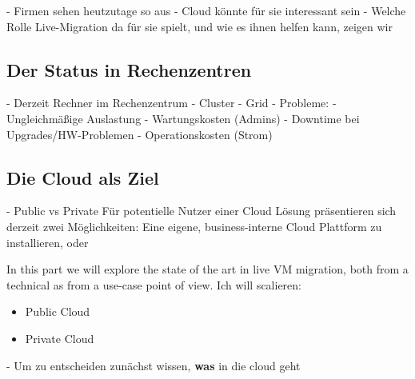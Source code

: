 \documentclass[draft,journal]{IEEEtran}
\begin{document}

- Firmen sehen heutzutage so aus
- Cloud könnte für sie interessant sein
- Welche Rolle Live-Migration da für sie spielt, und wie es ihnen
helfen kann, zeigen wir

\subsection{Der Status in Rechenzentren}
- Derzeit Rechner im Rechenzentrum
- Cluster
- Grid
- Probleme:
  - Ungleichmäßige Auslastung
  - Wartungskosten (Admins)
  - Downtime bei Upgrades/HW-Problemen
  - Operationskosten (Strom)

\subsection{Die Cloud als Ziel}
\label{sec:sota}
- Public vs Private
Für potentielle Nutzer einer Cloud Lösung präsentieren sich derzeit
zwei Möglichkeiten: Eine eigene, business-interne Cloud Plattform zu
installieren, oder 

In this part we will explore the state of the art in live VM
migration, both from a technical as from a use-case point of view.
Ich will scalieren:
\begin{itemize}
\item Public Cloud
\item Private Cloud
\end{itemize}
- Um zu entscheiden zunächst wissen, {\bf was} in die cloud geht
\end{document}
